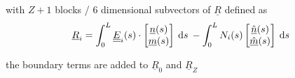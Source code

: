 \begin{frame}
  with $Z+1$ blocks / $6$ dimensional subvectors of $\underline{R}$ defined as
  \begin{displaymath}
    \underline{R}_i =
    \int_0^L
      \doubleunderline{E}_i(s) \cdot
      \begin{bmatrix}
        \underline{n}(s) \\ \underline{m}(s)
      \end{bmatrix}
    \: \dif s \:
    - \int_0^L
      N_i(s)
      \begin{bmatrix}
        \underline{\hat{n}}(s) \\ \underline{\hat{m}}(s)
      \end{bmatrix}
    \: \dif s \:
  \end{displaymath}
  
  the boundary terms are added to $\underline{R}_0$ and $\underline{R}_Z$

\end{frame}


